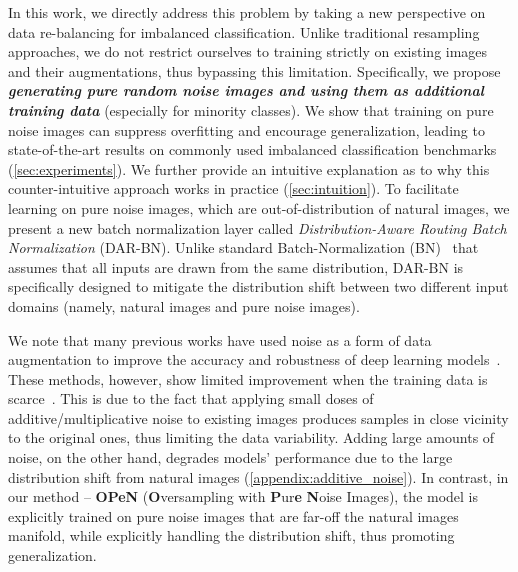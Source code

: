\documentclass[nohyperref]{article}
\theoremstyle{plain}
\theoremstyle{definition}
\theoremstyle{remark}
\begin{document}
In this work, we directly address this problem by taking a new perspective on data re-balancing for imbalanced classification. Unlike traditional resampling approaches, we do not restrict ourselves to training strictly on existing images and their augmentations, thus bypassing this limitation. Specifically, we propose \emph{\textbf{generating pure random noise images and using them as additional training data}} (especially for minority classes). We show that training on pure noise images can suppress overfitting and encourage generalization, leading to state-of-the-art results on commonly used imbalanced classification benchmarks (\cref{sec:experiments}). We further provide an intuitive explanation as to why this counter-intuitive approach works in practice (\cref{sec:intuition}).
To facilitate learning on pure noise images, which are out-of-distribution of natural images, we present a new batch normalization layer called \textit{Distribution-Aware Routing Batch Normalization} (DAR-BN). Unlike standard Batch-Normalization (BN)~\cite{ioffe2015batch} that assumes that all inputs are drawn from the same distribution, DAR-BN is specifically designed to mitigate the distribution shift between two different input domains (namely, natural images and pure noise images). 


We note that many previous works have used noise as a
form of data augmentation to improve the accuracy and robustness of deep learning models~\cite{koziarski2017image, lopes2019improving}. These methods,
however, show limited improvement when the training data
is scarce~\cite{koziarski2017image}. 
This is due to the fact that applying small doses of additive/multiplicative noise to existing images produces samples in close vicinity to the original ones, thus limiting the data variability. Adding large amounts of noise, on the other hand, degrades models' performance due to the large distribution shift from natural images (\cref{appendix:additive_noise}).
In contrast, in our method -- \textbf{OPeN} (\textbf{O}versampling with \textbf{P}ur\textbf{e} \textbf{N}oise Images), 
the model is explicitly trained on pure
noise images that are far-off the natural images manifold, while explicitly handling the distribution shift, thus promoting generalization.
\end{document}
